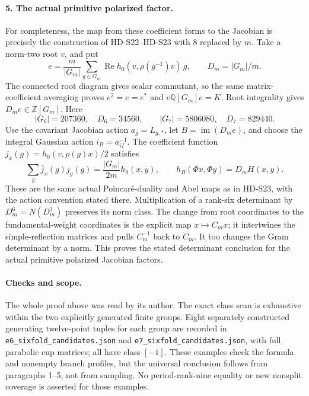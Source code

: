 \paragraph{5. The actual primitive polarized factor.}
For completeness, the map from these coefficient forms to the
Jacobian is precisely the construction of HD-S22--HD-S23 with 8
replaced by \(m\). Take a norm-two root \(v\), and put
\[
 e=\frac m{|G_m|}\sum_{g\in G_m}
       \operatorname{Re}h_0(v,\rho(g^{-1})v)\,g,
 \qquad D_m=|G_m|/m.
\]
The connected root diagram gives scalar commutant, so the same
matrix-coefficient averaging proves \(e^2=e=e^*\) and
\(e\mathbb Q[G_m]e=K\). Root integrality gives
\(D_me\in\mathbb Z[G_m]\). Here
\[
 |G_6|=207360,\quad D_6=34560,\qquad
 |G_7|=5806080,\quad D_7=829440.
\]
Use the covariant Jacobian action \(a_g=L_{g,*}\), let
\(B=\operatorname{im}(D_me)\), and choose the integral Gaussian
action \(i_B=a_{iI}^{-1}\). The coefficient function
\(j_x(g)=h_0(v,\rho(g)x)/2\) satisfies
\[
 \sum_g\bar j_x(g)j_y(g)=\frac{|G_m|}{2m}h_0(x,y),
 \qquad h_B(\Phi x,\Phi y)=D_m H(x,y).
\]
These are the same actual Poincar\'e-duality and Abel maps as in
HD-S23, with the action convention stated there. Multiplication of
a rank-six determinant by \(D_m^6=N(D_m^3)\) preserves its norm
class. The change from root coordinates to the fundamental-weight
coordinates is the explicit map \(x\mapsto C_mx\); it intertwines
the simple-reflection matrices and pulls \(C_m^{-1}\) back to
\(C_m\). It too changes the Gram determinant by a norm.
This proves the stated determinant conclusion for the actual
primitive polarized Jacobian factors.

\paragraph{Checks and scope.}
The whole proof above was read by its author. The exact class scan
is exhaustive within the two explicitly generated finite groups.
Eight separately constructed generating twelve-point tuples for
each group are recorded in \texttt{e6\_sixfold\_candidates.json}
and \texttt{e7\_sixfold\_candidates.json}, with full parabolic cup
matrices; all have class \([-1]\). These examples check the formula
and nonempty branch profiles, but the universal conclusion follows
from paragraphs 1--5, not from sampling. No period-rank-nine equality
or new nonsplit coverage is asserted for those examples.
